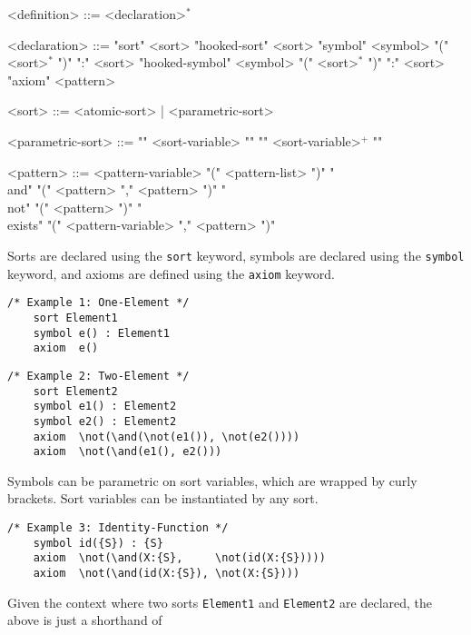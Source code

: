 \documentclass[UTF8,11pt]{article}
\theoremstyle{plain}
\theoremstyle{definition}
\theoremstyle{remark}
\begin{document}
\begin{grammar}\small
	<definition>    ::= <declaration>$^*$
	
	<declaration>   ::= "sort" <sort>
	\alt "hooked-sort" <sort>
	\alt "symbol" <symbol> "(" <sort>$^*$ ")" ":" <sort>
	\alt "hooked-symbol" <symbol> "(" <sort>$^*$ ")" ":" <sort>
	\alt "axiom" <pattern>
	
	<sort>          ::= <atomic-sort> | <parametric-sort>
	
	<parametric-sort> ::= "{" <sort-variable> "}"
	\alt <sort-constructor> "{" <sort-variable>$^+$ "}"
	
	<pattern> ::= <pattern-variable>
	\alt <symbol-id> "(" <pattern-list> ")"
	\alt "\\and" "(" <pattern> "," <pattern> ")"
	\alt "\\not" "(" <pattern> ")" 
	\alt "\\exists" "(" <pattern-variable> "," <pattern> ")"
\end{grammar}

\newcommand{\smalltt}[1]{\texttt{\small #1} }
\newcommand{\sort}{\smalltt{sort}}
\newcommand{\symb}{\smalltt{symbol}}
\newcommand{\axiom}{\smalltt{axiom}}


Sorts are declared using the \sort keyword, symbols are declared using the \symb keyword, and axioms are defined using the \axiom keyword.

\begin{Verbatim}[fontsize=\small]
    /* Example 1: One-Element */
    sort Element1
    symbol e() : Element1
    axiom  e()
\end{Verbatim}

\begin{Verbatim}[fontsize=\small]
    /* Example 2: Two-Element */
    sort Element2
    symbol e1() : Element2
    symbol e2() : Element2
    axiom  \not(\and(\not(e1()), \not(e2())))
    axiom  \not(\and(e1(), e2()))
\end{Verbatim}

Symbols can be parametric on sort variables, which are wrapped by curly brackets. 
Sort variables can be instantiated by any sort.

\begin{Verbatim}[fontsize=\small]
    /* Example 3: Identity-Function */
    symbol id({S}) : {S}
    axiom  \not(\and(X:{S},     \not(id(X:{S}))))
    axiom  \not(\and(id(X:{S}), \not(X:{S})))
\end{Verbatim}

Given the context where two sorts \smalltt{Element1} and \smalltt{Element2} are declared, the above is just a shorthand of
\end{document}
